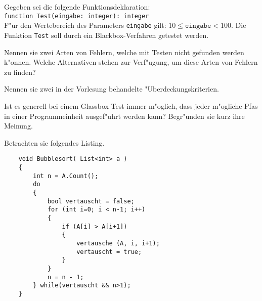 \documentclass[12pt]{exam}
\begin{document}
\begin{questions}

\question[6] Gegeben sei die folgende Funktionsdeklaration: \\\lstinline{function Test(eingabe: integer): integer}\\ F"ur den Wertebereich des Parameters \texttt{eingabe} gilt: $10 \leq \texttt{eingabe} < 100$. Die Funktion \texttt{Test} soll durch ein Blackbox-Verfahren getestet werden.
\addpoints
{}

\question[4] Nennen sie zwei Arten von Fehlern, welche mit Testen nicht gefunden werden k"onnen. Welche Alternativen stehen zur Verf"ugung, um diese Arten von Fehlern zu finden?
\addpoints

\question[2] Nennen sie zwei in der Vorlesung behandelte "Uberdeckungskriterien.
\addpoints

\question[2] Ist es generell bei einem Glassbox-Test immer m"oglich, dass jeder m"ogliche Pfas in einer Programmeinheit ausgef"uhrt werden kann? Begr"unden sie kurz ihre Meinung.
\addpoints

\question[12] Betrachten sie folgendes Listing.
\noaddpoints
\begin{lstlisting}
    void Bubblesort( List<int> a )
    {
        int n = A.Count();
        do
        {
            bool vertauscht = false;
            for (int i=0; i < n-1; i++)
            {
                if (A[i] > A[i+1])
                {
                    vertausche (A, i, i+1);
                    vertauscht = true;
                }
            }
            n = n - 1;
        } while(vertauscht && n>1);
    }
\end{lstlisting}
\begin{parts}

\end{parts}
\end{questions}
\end{document}
